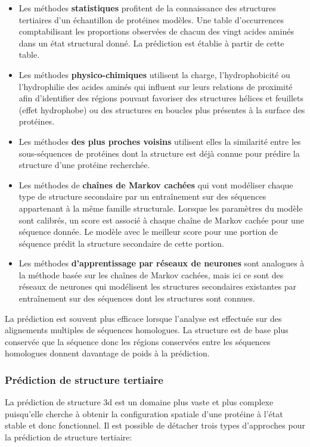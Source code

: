 \begin{itemize}
	\item Les méthodes \textbf{statistiques} profitent de la connaissance des structures tertiaires d'un échantillon de protéines modèles. Une table d'occurrences comptabilisant les proportions observées de chacun des vingt acides aminés dans un état structural donné. La prédiction est établie à partir de cette table.
	\item Les méthodes \textbf{physico-chimiques} utilisent la charge, l'hydrophobicité ou l'hydrophilie des acides aminés qui influent sur leurs relations de proximité afin d'identifier des régions pouvant favoriser des structures hélices et feuillets (effet hydrophobe) ou des structures en boucles plus présentes à la surface des protéines.
	\item Les méthodes \textbf{des plus proches voisins} utilisent elles la similarité entre les sous-séquences de protéines dont la structure est déjà connue pour prédire la structure d'une protéine recherchée.
	\item Les méthodes de \textbf{chaînes de Markov cachées} qui vont modéliser chaque type de structure secondaire par un entraînement sur des séquences appartenant à la même famille structurale. Lorsque les paramètres du modèle sont calibrés, un score est associé à chaque chaîne de Markov cachée pour une séquence donnée. Le modèle avec le meilleur score pour une portion de séquence prédit la structure secondaire de cette portion.
	\item Les méthodes \textbf{d'apprentissage par réseaux de neurones} sont analogues à la méthode basée sur les chaînes de Markov cachées, mais ici ce sont des réseaux de neurones qui modélisent les structures secondaires existantes par entraînement sur des séquences dont les structures sont connues.
\end{itemize}

La prédiction est souvent plus efficace lorsque l'analyse est effectuée sur des alignements multiples de séquences homologues. La structure est de base plus conservée que la séquence donc les régions conservées entre les séquences homologues donnent davantage de poids à la prédiction.

\subsubsection{Prédiction de structure tertiaire} 

La prédiction de structure 3d est un domaine plus vaste et plus complexe puisqu'elle cherche à obtenir la configuration spatiale d'une protéine à l'état stable et donc fonctionnel. Il est possible de détacher trois types d'approches pour la prédiction de structure tertiaire:

